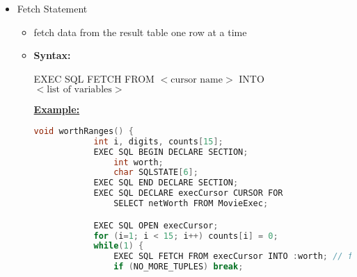 \documentclass[12pt]{article}
\begin{document}
\begin{enumerate}[1.]
\begin{enumerate}[a)]
\begin{itemize}
\begin{itemize}
                \bigskip

                \underline{\textbf{Example in Python:}}

                \bigskip

        \begin{lstlisting}[language=python]
        import sqlite3
        connection = sqlite3.connect("company.db")

        cursor = connection.cursor()

        staff_data = [ ("William", "Shakespeare", "m", "1961-10-25"),
                        ("Frank", "Schiller", "m", "1955-08-17"),
                        ("Jane", "Wall", "f", "1989-03-14") ]

        for p in staff_data:
            format_str = """INSERT INTO employee (staff_number, fname, lname, gender, birth_date)
            VALUES (NULL, "{first}", "{last}", "{gender}", "{birthdate}");"""

            sql_command = format_str.format(first=p[0], last=p[1], gender=p[2], birthdate = p[3])
            cursor.execute(sql_command)
        \end{lstlisting}
            \end{itemize}

            \item Fetch Statement
            \begin{itemize}
                \item fetch data from the result table one row at a time
                \item \textbf{Syntax:}

                EXEC SQL FETCH FROM $<\text{cursor name}>$ INTO $<\text{list of variables}>$

                \bigskip

                \underline{\textbf{Example:}}

                \bigskip

        \begin{lstlisting}[language=c]
        void worthRanges() {
            int i, digits, counts[15];
            EXEC SQL BEGIN DECLARE SECTION;
                int worth;
                char SQLSTATE[6];
            EXEC SQL END DECLARE SECTION;
            EXEC SQL DECLARE execCursor CURSOR FOR
                SELECT netWorth FROM MovieExec;

            EXEC SQL OPEN execCursor;
            for (i=1; i < 15; i++) counts[i] = 0;
            while(1) {
                EXEC SQL FETCH FROM execCursor INTO :worth; // fetches a row of value from movieExec and stores in worth
                if (NO_MORE_TUPLES) break;


\end{lstlisting}
\end{itemize}
\end{itemize}
\end{enumerate}
\end{enumerate}
\end{document}

